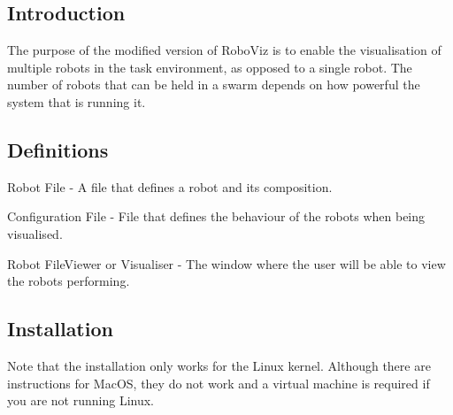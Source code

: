 
\subsection{Introduction}
\label{s:introduction}

The purpose of the modified version of RoboViz is to enable the visualisation
of multiple robots in the task environment, as opposed to a single robot. The
number of robots that can be held in a swarm depends on how powerful the system
that is running it.

\subsection{Definitions}
\label{s:definitions}

Robot File - A file that defines a robot and its composition.

Configuration File - File that defines the behaviour of the robots when being
visualised.

Robot FileViewer or Visualiser - The window where the user will be able to view
the robots performing.

\subsection{Installation}
\label{s:installation}
Note that the installation only works for the Linux kernel. Although there are
instructions for MacOS, they do not work and a virtual machine is required if
you are not running Linux.

